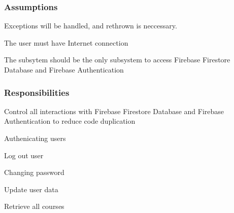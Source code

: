 \subsubsection{Assumptions}
\begin{itemize}
    \begin{item}
          Exceptions will be handled, and rethrown is neccessary.
    \end{item}
    \begin{item}
          The user must have Internet connection
    \end{item}
    \begin{item}
          The subsytem should be the only subsystem to access Firebase Firestore Database and Firebase Authentication
    \end{item}
\end{itemize}

\subsubsection{Responsibilities}
\begin{itemize}
    \begin{item}
          Control all interactions with Firebase Firestore Database and Firebase Authentication to reduce code duplication
    \end{item}
    \begin{item}
          Authenicating users
    \end{item}
    \begin{item}
          Log out user
    \end{item}
    \begin{item}
          Changing password
    \end{item}
    \begin{item}
          Update user data
    \end{item}
    \begin{item}
          Retrieve all courses
    \end{item}
\end{itemize}

